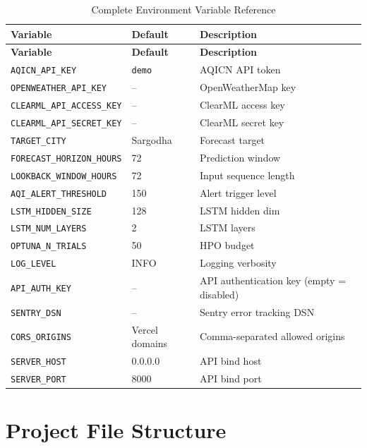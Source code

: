\documentclass[12pt, a4paper, oneside]{article}
\begin{document}
\begin{longtable}{l l p{5cm}}
\caption{Complete Environment Variable Reference} \\
\toprule
\textbf{Variable} & \textbf{Default} & \textbf{Description} \\
\midrule
\endfirsthead
\toprule
\textbf{Variable} & \textbf{Default} & \textbf{Description} \\
\midrule
\endhead
\texttt{AQICN\_API\_KEY} & \texttt{demo} & AQICN API token \\
\texttt{OPENWEATHER\_API\_KEY} & -- & OpenWeatherMap key \\
\texttt{CLEARML\_API\_ACCESS\_KEY} & -- & ClearML access key \\
\texttt{CLEARML\_API\_SECRET\_KEY} & -- & ClearML secret key \\
\texttt{TARGET\_CITY} & Sargodha & Forecast target \\
\texttt{FORECAST\_HORIZON\_HOURS} & 72 & Prediction window \\
\texttt{LOOKBACK\_WINDOW\_HOURS} & 72 & Input sequence length \\
\texttt{AQI\_ALERT\_THRESHOLD} & 150 & Alert trigger level \\
\texttt{LSTM\_HIDDEN\_SIZE} & 128 & LSTM hidden dim \\
\texttt{LSTM\_NUM\_LAYERS} & 2 & LSTM layers \\
\texttt{OPTUNA\_N\_TRIALS} & 50 & HPO budget \\
\texttt{LOG\_LEVEL} & INFO & Logging verbosity \\
\texttt{API\_AUTH\_KEY} & -- & API authentication key (empty = disabled) \\
\texttt{SENTRY\_DSN} & -- & Sentry error tracking DSN \\
\texttt{CORS\_ORIGINS} & Vercel domains & Comma-separated allowed origins \\
\texttt{SERVER\_HOST} & 0.0.0.0 & API bind host \\
\texttt{SERVER\_PORT} & 8000 & API bind port \\
\bottomrule
\end{longtable}

\section{Project File Structure}
\end{document}
